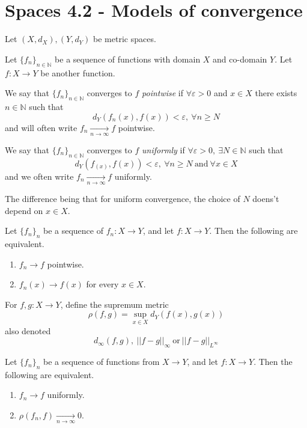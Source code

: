 \section{Spaces 4.2 - Models of convergence} 
\begin{defn}
    Let $(X,d_X), (Y,d_Y)$ be metric spaces. 

    Let $\{f_n\}_{n\in\mathbb N}$ be a sequence of functions 
    with domain $X$ and co-domain $Y$. Let $f : X \to Y$ be 
    another function. 

    We say that 
    $\{f_n\}_{n\in\mathbb N}$ converges to $f$ \emph{pointwise} 
    if $\forall \varepsilon > 0$ and $x \in X$ there exists 
    $n \in \mathbb N$ such that 
    \[
        d_Y(f_n(x),f(x)) < \varepsilon, \: \forall n \geq N
    \]
    and will often write $f_n \underset{n \to \infty}{\to} f$ 
    pointwise. 

    We say that $\{f_n\}_{n\in\mathbb N}$ converges to 
    $f$ \emph{uniformly} if $\forall \varepsilon > 0, \: \exists 
    N \in \mathbb N$ such that 
    \[
        d_Y(f_(x), f(x)) < \varepsilon, \: \forall n \geq N 
        \ \text{and} \ \forall x \in X
    \]
    and we often write $f_n \underset{n \to \infty}{\to} f$ 
    uniformly. 

    The difference being that for uniform convergence, 
    the choice of $N$ doens't depend on $x \in X$. 
\end{defn}
\begin{prop}
    Let $\{f_n\}_n$ be a sequence of $f_n : X \to Y$, and let 
    $f: X \to Y$. Then the following are equivalent. 

    \begin{enumerate}
        \item $f_n \to f$ pointwise.
        \item $f_n(x) \to f(x)$ for every $x \in X$. 
    \end{enumerate}
\end{prop}
\begin{defn}
    For $f,g : X \to Y$, define the supremum metric 
    \[
        \rho(f,g) = \sup_{x\in X} d_Y(f(x),g(x))
    \]
    also denoted 
    \[
        d_\infty(f,g), \ ||f-g||_\infty \ \text{or} \ 
        ||f-g||_{L^\infty}
    \]
\end{defn}
\begin{prop}
    Let $\{f_n\}_n$ be a sequence of functions from $X \to Y$, 
    and let $f: X \to Y$. Then the following are equivalent. 

    \begin{enumerate}
        \item $f_n \to f$ uniformly. 
        \item $\rho(f_n,f) \underset{n \to \infty}{\to} 0$.
    \end{enumerate}
\end{prop}


